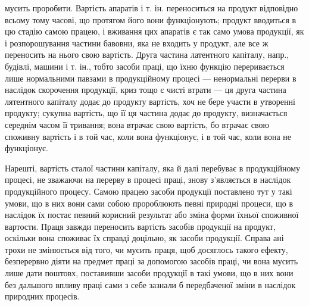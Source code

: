 \parcont{}  %
мусить проробити. Вартість апаратів і т. ін. переноситься на продукт
відповідно всьому тому часові, що протягом його вони функціонують;
продукт вводиться в цю стадію самою працею, і вживання цих апаратів
є так само умова продукції, як і розпорошування частини
бавовни, яка не входить у продукт, але все ж    переносить на нього
свою вартість. Друга частина латентного капіталу, напр., будівлі, машини
і т. ін., тобто засоби праці, що їхню функцію переривається лише
нормальними павзами в продукційному процесі — ненормальні
перерви в наслідок скорочення продукції, криз тощо є чисті
втрати — ця друга частина лятентного капіталу додає до продукту
вартість, хоч не бере участи в утворенні продукту; сукупна вартість, що
її ця частина додає до продукту, визначається середнім часом її тривання;
вона втрачає свою вартість, бо втрачає свою споживну вартість і в той
час, коли вона функціонує, і в той час, коли вона не функціонує.

Нарешті, вартість сталої частини капіталу, яка й далі перебуває в
продукційному процесі, не зважаючи на перерву в процесі праці, знову
з’являється в наслідок продукційного процесу. Самою працею засоби
продукції поставлено тут у такі умови, що в них вони сами собою пророблюють
певні природні процеси, що в наслідок їх постає певний
корисний результат або зміна форми їхньої споживної вартости. Праця
завжди переносить вартість засобів продукції на продукт, оскільки вона
споживає їх справді доцільно, як засоби продукції. Справа ані трохи не
змінюється від того, чи мусить праця, щоб досяглось такого ефекту,
безперервно діяти на предмет праці за допомогою засобів праці, чи вона
мусить лише дати поштовх, поставивши засоби продукції в такі умови,
що в них вони без дальшого впливу праці сами з себе зазнали б
передбаченої зміни в наслідок природних процесів.

